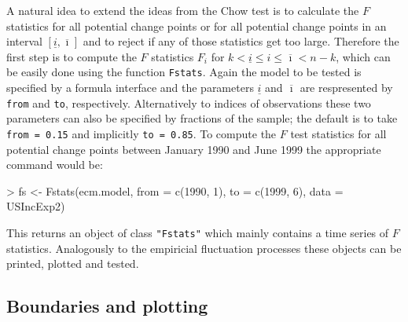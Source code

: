\documentclass[10pt,a4paper]{article}
\newcommand{\ui}{\underline{i}}
\newcommand{\oi}{\overline{\imath}}
\begin{document}
A natural idea to extend the ideas from the Chow test is to calculate the $F$
statistics for all potential change points or for all potential change points in
an interval $[\ui, \oi]$ and to reject if any of those statistics get too large.
Therefore the first step is to compute the $F$ statistics $F_i$ for $k < \ui \le
i \le \oi < n-k$, which can be easily done using the function {\tt Fstats}.
Again the model to be tested is specified by a formula interface and the
parameters $\ui$ and $\oi$ are respresented by {\tt from} and {\tt to},
respectively. Alternatively to indices of observations these two parameters can 
also be specified by fractions of the sample; the default is to take {\tt from =
0.15} and implicitly {\tt to = 0.85}. To compute the $F$ test statistics for all
potential change points between January 1990 and June 1999 the appropriate
command would be:
\begin{Schunk}
\begin{Sinput}
> fs <- Fstats(ecm.model, from = c(1990, 1), to = c(1999, 6), data = USIncExp2)
\end{Sinput}
\end{Schunk}
This returns an object of class {\tt "Fstats"} which mainly contains a time
series of $F$ statistics. Analogously to the empiricial fluctuation processes
these objects can be printed, plotted and tested.

\subsection{Boundaries and plotting}
\end{document}
